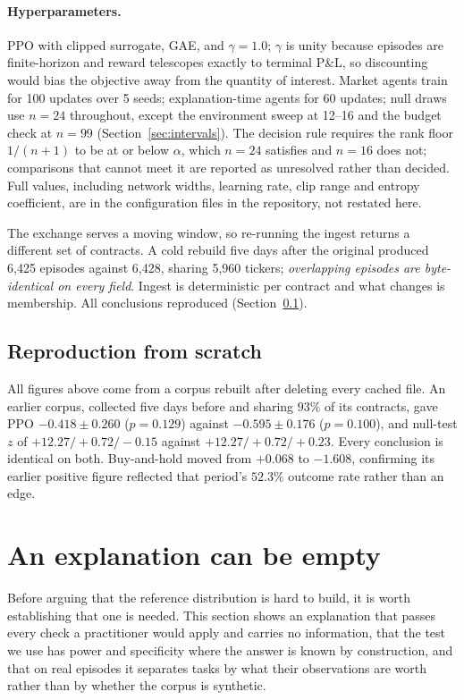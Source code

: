 \documentclass[10pt,twocolumn]{article}
\begin{document}
\paragraph{Hyperparameters.} PPO with clipped surrogate, GAE, and
$\gamma=1.0$; $\gamma$ is unity because episodes are finite-horizon and reward
telescopes exactly to terminal P\&L, so discounting would bias the objective
away from the quantity of interest. Market agents train for 100 updates over 5
seeds; explanation-time agents for 60 updates; null draws use $n=24$ throughout, except the
environment sweep at 12--16 and the budget check at $n=99$
(Section~\ref{sec:intervals}). The decision rule requires the rank floor
$1/(n+1)$ to be at or below $\alpha$, which $n=24$ satisfies and $n=16$ does
not; comparisons that cannot meet it are reported as unresolved rather than
decided. Full
values, including network widths, learning rate, clip range and entropy
coefficient, are in the configuration files in the repository, not
restated here.

The exchange serves a moving window, so re-running the ingest returns a different
set of contracts. A cold rebuild five days after the original produced 6{,}425
episodes against 6{,}428, sharing 5{,}960 tickers; \emph{overlapping episodes are
byte-identical on every field}. Ingest is deterministic per contract and what
changes is membership. All conclusions reproduced (Section~\ref{sec:repro}).

\subsection{Reproduction from scratch}
\label{sec:repro}

All figures above come from a corpus rebuilt after deleting every cached file. An
earlier corpus, collected five days before and sharing $93\%$ of its contracts,
gave PPO $-0.418 \pm 0.260$ ($p=0.129$) against $-0.595 \pm 0.176$ ($p=0.100$),
and null-test $z$ of $+12.27 / +0.72 / -0.15$ against $+12.27 / +0.72 / +0.23$.
Every conclusion is identical on both. Buy-and-hold moved from $+0.068$ to
$-1.608$, confirming its earlier positive figure reflected that period's $52.3\%$
outcome rate rather than an edge.

\section{An explanation can be empty}

Before arguing that the reference distribution is hard to build, it is worth
establishing that one is needed. This section shows an explanation that passes
every check a practitioner would apply and carries no information, that the test
we use has power and specificity where the answer is known by construction, and
that on real episodes it separates tasks by what their observations are worth
rather than by whether the corpus is synthetic.
\end{document}
